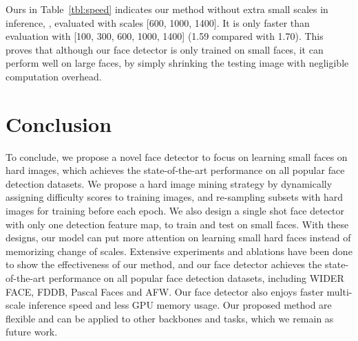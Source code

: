 \documentclass[10pt,twocolumn,letterpaper]{article}
\begin{document}
Ours in Table~\ref{tbl:speed} indicates our method without extra small scales in
inference, \ie, evaluated with scales {[}600, 1000, 1400{]}. It is only  faster
than evaluation with {[}100, 300, 600, 1000, 1400{]} (1.59 compared with 1.70). This
proves that although our face detector is only trained on small faces, it can perform
well on large faces, by simply shrinking the testing image with negligible computation
overhead.

\section{Conclusion}\label{sec:conclusion}
To conclude, we propose a novel face detector to focus on learning small faces on hard images, which
achieves the state-of-the-art performance on all popular face detection datasets. We propose a hard
image mining strategy by dynamically assigning difficulty scores to training images, and re-sampling
subsets with hard images for training before each epoch.
We also design a single shot face detector with only one detection feature map, to train and test
on small faces. With these designs, our model can put more
attention on learning small hard faces instead of memorizing change of scales.
Extensive experiments and ablations have
been done to show the effectiveness of our method, and our face detector achieves the
state-of-the-art performance on all popular face detection datasets, including WIDER FACE, FDDB, Pascal Faces and AFW. Our face detector also enjoys faster multi-scale inference
speed and less GPU memory usage.
Our proposed method are flexible and can be applied to other backbones and tasks,
which we remain as future work.

{\small


}
\end{document}
